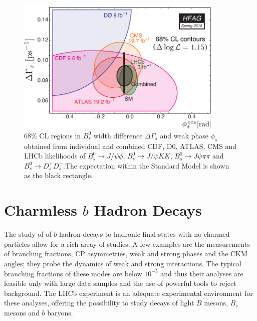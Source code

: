 \begin{figure}[!htb]
\begin{center}
\includegraphics[width=10cm]{hfag_Spring2016_DGsphis_zoom.pdf}
\end{center}
\caption{68\% CL regions in $B^{0}_{s}$ width difference $\Delta\Gamma_{s}$
and weak phase $\phi_{s}$ obtained from individual and combined CDF, D0,
ATLAS, CMS and LHCb likelihoods of $B^{0}_{s}\to J/\psi\phi$, $B^{0}_{s}\to
J/\psi KK$, $B^{0}_{s}\to J\psi\pi\pi$ and $B^{0}_{s}\to D_{s}^{+}D_{s}^{-}%
$.The expectation within the Standard Model is shown as the black rectangle.}%
\label{figphis}%
\end{figure}





\section{Charmless $b$ Hadron Decays}
\label{sec:charmless}

The study of of $b$-hadron decays to hadronic final states with no charmed particles allow for a rich array of studies. A few examples are the measurements of branching fractions, CP asymmetries, weak and strong phases and the CKM angles; they probe the dynamics of weak and strong interactions. The typical branching fractions of these modes are below $10^{-5}$ and thus their analyses are feasible only with large data samples and the use of powerful tools to reject background. The LHCb experiment is an adequate experimental environment for these analyses, offering the possibility to study decays of light $B$ mesons, $B_s$ mesons and $b$ baryons.

